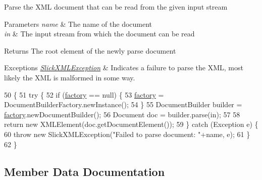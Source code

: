 Parse the X\+ML document that can be read from the given input stream


\begin{DoxyParams}{Parameters}
{\em name} & The name of the document \\
\hline
{\em in} & The input stream from which the document can be read \\
\hline
\end{DoxyParams}
\begin{DoxyReturn}{Returns}
The root element of the newly parse document 
\end{DoxyReturn}

\begin{DoxyExceptions}{Exceptions}
{\em \mbox{\hyperlink{classorg_1_1newdawn_1_1slick_1_1util_1_1xml_1_1_slick_x_m_l_exception}{Slick\+X\+M\+L\+Exception}}} & Indicates a failure to parse the X\+ML, most likely the X\+ML is malformed in some way. \\
\hline
\end{DoxyExceptions}

\begin{DoxyCode}
50                                                                                   \{
51         \textcolor{keywordflow}{try} \{
52             \textcolor{keywordflow}{if} (\mbox{\hyperlink{classorg_1_1newdawn_1_1slick_1_1util_1_1xml_1_1_x_m_l_parser_add3e50cbc880252b74c5e60d886d32ac}{factory}} == null) \{
53                 \mbox{\hyperlink{classorg_1_1newdawn_1_1slick_1_1util_1_1xml_1_1_x_m_l_parser_add3e50cbc880252b74c5e60d886d32ac}{factory}} = DocumentBuilderFactory.newInstance();
54             \}
55             DocumentBuilder builder = \mbox{\hyperlink{classorg_1_1newdawn_1_1slick_1_1util_1_1xml_1_1_x_m_l_parser_add3e50cbc880252b74c5e60d886d32ac}{factory}}.newDocumentBuilder();
56             Document doc = builder.parse(in);
57             
58             \textcolor{keywordflow}{return} \textcolor{keyword}{new} XMLElement(doc.getDocumentElement());
59         \} \textcolor{keywordflow}{catch} (Exception e) \{
60             \textcolor{keywordflow}{throw} \textcolor{keyword}{new} SlickXMLException(\textcolor{stringliteral}{"Failed to parse document: "}+name, e);
61         \}
62     \}
\end{DoxyCode}


\subsection{Member Data Documentation}
\mbox{\label{classorg_1_1newdawn_1_1slick_1_1util_1_1xml_1_1_x_m_l_parser_add3e50cbc880252b74c5e60d886d32ac}} 
